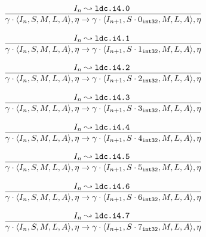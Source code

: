 \documentclass{article}
\numberwithin{equation}{section}
\newcommand{\mstate}[5] {
	\langle#1, #2, #3, #4, #5\rangle
}
\newcommand{\ipointsto}[3] {
	#1 \leadsto \texttt{#2} \text{ } #3
}
\newcommand{\sval}[2] {
	#1_\texttt{#2}
}
\begin{document}
\begin{equation}
\label{eq:semantics_ldci40}
	\infer{
		\gamma \cdot \mstate{I_n}{S}{M}{L}{A}, \eta
			\rightarrow
		\gamma \cdot \mstate{I_{n+1}}{S \cdot \sval{0}{int32}}{M}{L}{A}, \eta
	}
	{\ipointsto{I_n}{ldc.i4.0}}
\end{equation}

\begin{equation}
\label{eq:semantics_ldci41}
	\infer{
		\gamma \cdot \mstate{I_n}{S}{M}{L}{A}, \eta
			\rightarrow
		\gamma \cdot \mstate{I_{n+1}}{S \cdot \sval{1}{int32}}{M}{L}{A}, \eta
	}
	{\ipointsto{I_n}{ldc.i4.1}}
\end{equation}

\begin{equation}
\label{eq:semantics_ldci42}
	\infer{
		\gamma \cdot \mstate{I_n}{S}{M}{L}{A}, \eta
			\rightarrow
		\gamma \cdot \mstate{I_{n+1}}{S \cdot \sval{2}{int32}}{M}{L}{A}, \eta
	}
	{\ipointsto{I_n}{ldc.i4.2}}
\end{equation}

\begin{equation}
\label{eq:semantics_ldci43}
	\infer{
		\gamma \cdot \mstate{I_n}{S}{M}{L}{A}, \eta
			\rightarrow
		\gamma \cdot \mstate{I_{n+1}}{S \cdot \sval{3}{int32}}{M}{L}{A}, \eta
	}
	{\ipointsto{I_n}{ldc.i4.3}}
\end{equation}

\begin{equation}
\label{eq:semantics_ldci44}
	\infer{
		\gamma \cdot \mstate{I_n}{S}{M}{L}{A}, \eta
			\rightarrow
		\gamma \cdot \mstate{I_{n+1}}{S \cdot \sval{4}{int32}}{M}{L}{A}, \eta
	}
	{\ipointsto{I_n}{ldc.i4.4}}
\end{equation}

\begin{equation}
\label{eq:semantics_ldci45}
	\infer{
		\gamma \cdot \mstate{I_n}{S}{M}{L}{A}, \eta
			\rightarrow
		\gamma \cdot \mstate{I_{n+1}}{S \cdot \sval{5}{int32}}{M}{L}{A}, \eta
	}
	{\ipointsto{I_n}{ldc.i4.5}}
\end{equation}

\begin{equation}
\label{eq:semantics_ldci46}
	\infer{
		\gamma \cdot \mstate{I_n}{S}{M}{L}{A}, \eta
			\rightarrow
		\gamma \cdot \mstate{I_{n+1}}{S \cdot \sval{6}{int32}}{M}{L}{A}, \eta
	}
	{\ipointsto{I_n}{ldc.i4.6}}
\end{equation}

\begin{equation}
\label{eq:semantics_ldci47}
	\infer{
		\gamma \cdot \mstate{I_n}{S}{M}{L}{A}, \eta
			\rightarrow
		\gamma \cdot \mstate{I_{n+1}}{S \cdot \sval{7}{int32}}{M}{L}{A}, \eta
	}
	{\ipointsto{I_n}{ldc.i4.7}}
\end{equation}
\end{document}
